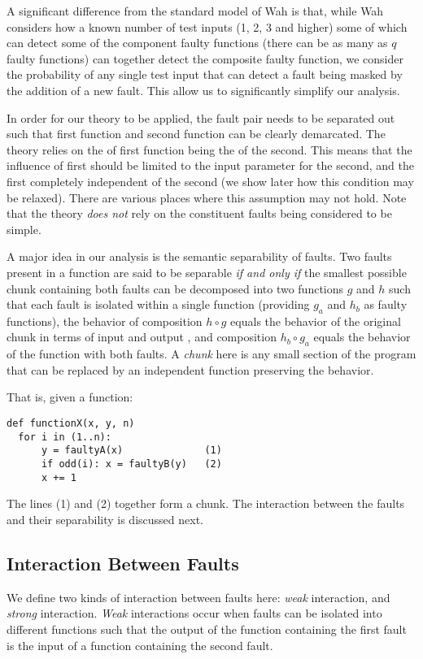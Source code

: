 \documentclass[preprint,nonatbib]{sigplanconf}\usepackage[]{graphicx}\usepackage[]{color}
\begin{document}
A significant difference from the standard \qfunction model of Wah is that,
while Wah considers how a known number of test inputs (1, 2, 3 and
higher) some of which can detect some of the component faulty functions (there
can be as many as $q$ faulty functions) can together detect the composite faulty
function, we consider the probability of any single test input that can detect a
fault being masked by the addition of a new fault.
This allow us to significantly simplify our analysis.

In order for our theory to be applied, the fault pair needs to be separated out
such that first function and second function can be clearly demarcated. The
theory relies on the \foutput of first function being the \finput of the second.
This means that the influence of first should be limited to the input parameter
for the second, and the first completely independent of the second (we show
later how this condition may be relaxed). There are various places where this
assumption may not hold. Note that the theory \emph{does not} rely on the
constituent faults being considered to be simple.

A major idea in our analysis is the semantic separability of faults. Two faults
present in a function are said to be separable \emph{if and only if} the
smallest possible chunk containing both faults can be decomposed into two
functions $g$ and $h$ such that each fault is isolated within a single function
(providing $g_a$ and $h_b$ as faulty functions), the behavior of composition
$h \circ g$ equals the behavior of the original chunk in terms of input and
output , and composition $h_b \circ g_a$ equals the behavior of the function
with both faults. A \emph{chunk} here is any small section of the program that can
be replaced by an independent function preserving the behavior.

That is, given a function:
\begin{lstlisting}
def functionX(x, y, n)
  for i in (1..n):
      y = faultyA(x)              (1)
      if odd(i): x = faultyB(y)   (2)
      x += 1
\end{lstlisting}
The lines (1) and (2) together form a chunk.
The interaction between the
faults and their separability is discussed next.

\subsection{Interaction Between Faults}
We define two kinds of interaction between faults here: \emph{weak}
interaction, and \emph{strong} interaction. \emph{Weak}
interactions occur when faults can be isolated into different
functions such that the output of the function containing the first fault is
the input of a function containing the second fault.
\end{document}
